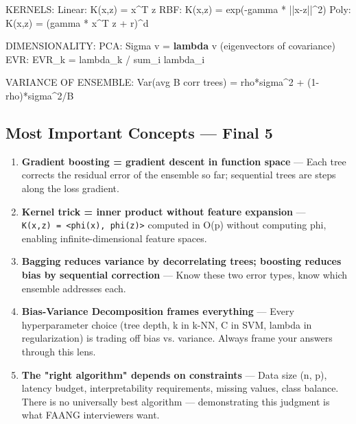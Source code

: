 \documentclass[11pt]{article}
\newenvironment{Shaded}{\begin{snugshade}}{\end{snugshade}}
\newcommand{\DecValTok}[1]{\textcolor[rgb]{0.96,0.45,0.00}{#1}}
\newcommand{\KeywordTok}[1]{\textcolor[rgb]{0.81,0.81,0.76}{\textbf{#1}}}
\newcommand{\NormalTok}[1]{\textcolor[rgb]{0.81,0.81,0.76}{#1}}
\newcommand{\OperatorTok}[1]{\textcolor[rgb]{0.81,0.81,0.76}{#1}}
\begin{document}
\begin{Shaded}
\begin{Highlighting}[]
\NormalTok{KERNELS:}
\NormalTok{Linear:   K(x,z) }\OperatorTok{=}\NormalTok{ x}\OperatorTok{\^{}}\NormalTok{T z}
\NormalTok{RBF:      K(x,z) }\OperatorTok{=}\NormalTok{ exp(}\OperatorTok{{-}}\NormalTok{gamma }\OperatorTok{*} \OperatorTok{||}\NormalTok{x}\OperatorTok{{-}}\NormalTok{z}\OperatorTok{||\^{}}\DecValTok{2}\NormalTok{)}
\NormalTok{Poly:     K(x,z) }\OperatorTok{=}\NormalTok{ (gamma }\OperatorTok{*}\NormalTok{ x}\OperatorTok{\^{}}\NormalTok{T z }\OperatorTok{+}\NormalTok{ r)}\OperatorTok{\^{}}\NormalTok{d}

\NormalTok{DIMENSIONALITY:}
\NormalTok{PCA:      Sigma v }\OperatorTok{=} \KeywordTok{lambda}\NormalTok{ v    (eigenvectors of covariance)}
\NormalTok{EVR:      EVR\_k }\OperatorTok{=}\NormalTok{ lambda\_k }\OperatorTok{/}\NormalTok{ sum\_i lambda\_i}

\NormalTok{VARIANCE OF ENSEMBLE:}
\NormalTok{Var(avg B corr trees) }\OperatorTok{=}\NormalTok{ rho}\OperatorTok{*}\NormalTok{sigma}\OperatorTok{\^{}}\DecValTok{2} \OperatorTok{+}\NormalTok{ (}\DecValTok{1}\OperatorTok{{-}}\NormalTok{rho)}\OperatorTok{*}\NormalTok{sigma}\OperatorTok{\^{}}\DecValTok{2}\OperatorTok{/}\NormalTok{B}
\end{Highlighting}
\end{Shaded}

\subsection{Most Important Concepts --- Final 5}\label{most-important-concepts--final-5}

\begin{enumerate}
\def\labelenumi{\arabic{enumi}.}
\item
  \textbf{Gradient boosting = gradient descent in function space} --- Each tree corrects the residual error of the ensemble so far; sequential trees are steps along the loss gradient.
\item
  \textbf{Kernel trick = inner product without feature expansion} --- \texttt{K(x,z)\ =\ \textless{}phi(x),\ phi(z)\textgreater{}} computed in O(p) without computing phi, enabling infinite-dimensional feature spaces.
\item
  \textbf{Bagging reduces variance by decorrelating trees; boosting reduces bias by sequential correction} --- Know these two error types, know which ensemble addresses each.
\item
  \textbf{Bias-Variance Decomposition frames everything} --- Every hyperparameter choice (tree depth, k in k-NN, C in SVM, lambda in regularization) is trading off bias vs. variance. Always frame your answers through this lens.
\item
  \textbf{The "right algorithm" depends on constraints} --- Data size (n, p), latency budget, interpretability requirements, missing values, class balance. There is no universally best algorithm --- demonstrating this judgment is what FAANG interviewers want.
\end{enumerate}
\end{document}
